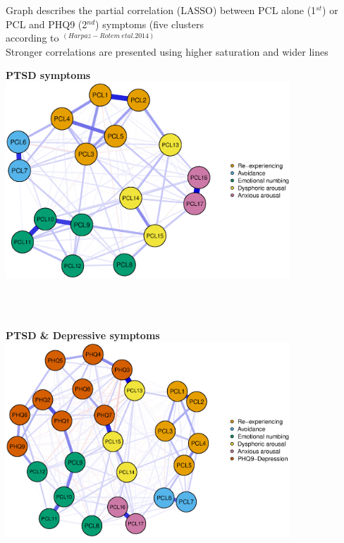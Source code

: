 \documentclass[]{betterposter}
\begin{document}
{Graph describes the partial correlation (LASSO) between PCL alone (1$^{st}$) or PCL and PHQ9 (2$^{nd}$) symptoms
(five clusters\\ according to $^{(Harpaz-Rotem \ et al. 2014)}$ \\ %
Stronger correlations are presented using higher saturation and wider lines
\begin{center}
\textbf{PTSD symptoms}
\includegraphics[width=0.8\textwidth]{img/pclOnlyNetwrork.eps}
\end{center}
\\

\\
\begin{center}
\textbf{PTSD \& Depressive symptoms}
\includegraphics[width=0.8\textwidth]{img/pclPHQ9_network.eps}
\end{center}

}
\end{document}
